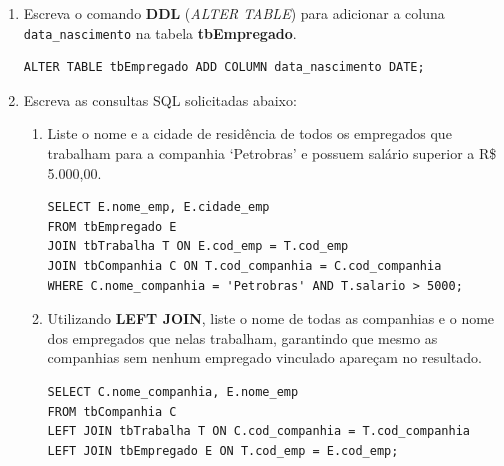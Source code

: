 \documentclass[12pt,a4paper]{article}
\begin{document}
\begin{enumerate}
\begin{lstlisting}
-- Insercoes em tbTrabalha
INSERT INTO tbTrabalha (cod_emp, cod_companhia, salario)
VALUES (501, 101, 6500.00), (502, 102, 4500.00);
\end{lstlisting}

    \item Escreva o comando \textbf{DDL} (\textit{ALTER TABLE}) para adicionar a coluna \texttt{data\_nascimento} na tabela \textbf{tbEmpregado}.\\
\begin{lstlisting}
ALTER TABLE tbEmpregado ADD COLUMN data_nascimento DATE;
\end{lstlisting}

    \item Escreva as consultas SQL solicitadas abaixo:
    \begin{enumerate}[label=\alph*)]
        \item Liste o nome e a cidade de residência de todos os empregados que trabalham para a companhia `Petrobras' e possuem salário superior a R\$ 5.000,00.\\
\begin{lstlisting}
SELECT E.nome_emp, E.cidade_emp
FROM tbEmpregado E
JOIN tbTrabalha T ON E.cod_emp = T.cod_emp
JOIN tbCompanhia C ON T.cod_companhia = C.cod_companhia
WHERE C.nome_companhia = 'Petrobras' AND T.salario > 5000;
\end{lstlisting}

        \item Utilizando \textbf{LEFT JOIN}, liste o nome de todas as companhias e o nome dos empregados que nelas trabalham, garantindo que mesmo as companhias sem nenhum empregado vinculado apareçam no resultado.\\
\begin{lstlisting}
SELECT C.nome_companhia, E.nome_emp
FROM tbCompanhia C
LEFT JOIN tbTrabalha T ON C.cod_companhia = T.cod_companhia
LEFT JOIN tbEmpregado E ON T.cod_emp = E.cod_emp;
\end{lstlisting}
    \end{enumerate}
\end{enumerate}

\vspace{0.5cm} 
\end{document}
